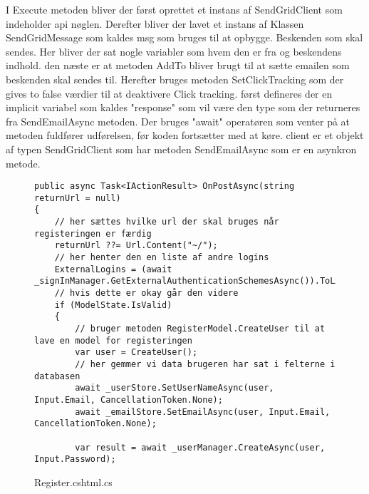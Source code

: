 I Execute metoden bliver der først oprettet et instans af SendGridClient som indeholder api nøglen.
Derefter bliver der lavet et instans af Klassen SendGridMessage som kaldes msg som bruges til at opbygge. 
Beskenden som skal sendes. Her bliver der sat nogle variabler som hvem den er fra og beskendens indhold. 
den næste er at metoden AddTo bliver brugt til at sætte emailen som beskenden skal sendes til. Herefter bruges metoden 
SetClickTracking som der gives to false værdier til at deaktivere Click tracking. først defineres der en implicit variabel 
som kaldes "response" som vil være den type som der returneres fra SendEmailAsync metoden. Der bruges "await" operatøren som venter
på at metoden fuldfører udførelsen, før koden fortsætter med at køre. client er et objekt af typen SendGridClient som har metoden
SendEmailAsync som er en asynkron metode.

\begin{figure}[!h]
    \begin{verbatim}
public async Task<IActionResult> OnPostAsync(string returnUrl = null)
{
    // her sættes hvilke url der skal bruges når registeringen er færdig
    returnUrl ??= Url.Content("~/");
    // her henter den en liste af andre logins
    ExternalLogins = (await _signInManager.GetExternalAuthenticationSchemesAsync()).ToList();
    // hvis dette er okay går den videre
    if (ModelState.IsValid)
    {
        // bruger metoden RegisterModel.CreateUser til at lave en model for registeringen
        var user = CreateUser();
        // her gemmer vi data brugeren har sat i felterne i databasen
        await _userStore.SetUserNameAsync(user, Input.Email, CancellationToken.None);
        await _emailStore.SetEmailAsync(user, Input.Email, CancellationToken.None);
        
        var result = await _userManager.CreateAsync(user, Input.Password);
\end{verbatim}
\caption{Register.cshtml.cs}\label{code:Register.cshtml.cs}
\end{figure}


